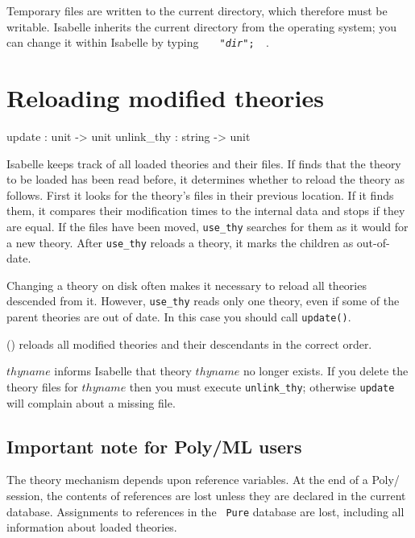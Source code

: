 \begin{warn}
  Temporary files are written to the current directory, which therefore
  must be writable.  Isabelle inherits the current directory from the
  operating system; you can change it within Isabelle by typing
  \hbox{\tt\ \  "{\it dir}";\ \ }.
\end{warn}


\section{Reloading modified theories}\label{sec:reloading-theories}
\begin{ttbox} 
update     : unit -> unit
unlink_thy : string -> unit
\end{ttbox}
Isabelle keeps track of all loaded theories and their files.  If
 finds that the theory to be loaded has been read before,
it determines whether to reload the theory as follows.  First it looks for
the theory's files in their previous location.  If it finds them, it
compares their modification times to the internal data and stops if they
are equal.  If the files have been moved, {\tt use_thy} searches for them
as it would for a new theory.  After {\tt use_thy} reloads a theory, it
marks the children as out-of-date.
\begin{warn}
  Changing a theory on disk often makes it necessary to reload all theories
  descended from it.  However, {\tt use_thy} reads only one theory, even if
  some of the parent theories are out of date.  In this case you should
  call {\tt update()}.
\end{warn}

\begin{ttdescription}
\item[\ttindexbold{update} ()] 
  reloads all modified theories and their descendants in the correct order.  

\item[\ttindexbold{unlink_thy} $thyname$]
  informs Isabelle that theory $thyname$ no longer exists.  If you delete the
  theory files for $thyname$ then you must execute {\tt unlink_thy};
  otherwise {\tt update} will complain about a missing file.
\end{ttdescription}


\subsection{Important note for Poly/ML users}
The theory mechanism depends upon reference variables.  At the end of a
Poly/\ML{} session, the contents of references are lost unless they are
declared in the current database.  Assignments to references in the {\tt
  Pure} database are lost, including all information about loaded theories.

